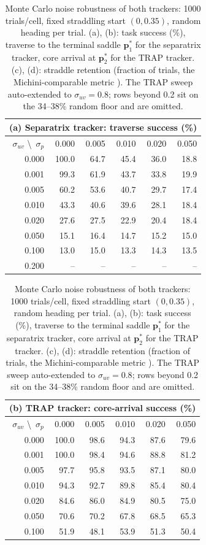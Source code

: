 \documentclass[lettersize,journal]{IEEEtran}
\begin{document}
\begin{table}[!t]
\centering
\caption{Monte Carlo noise robustness of both trackers: 1000
trials/cell, fixed straddling start $(0, 0.35)$, random heading per
trial. (a), (b): task success (\%), traverse to the terminal saddle
$\mathbf{p}^*_1$ for the separatrix tracker, core arrival at
$\mathbf{p}^*_2$ for the TRAP tracker. (c), (d): straddle retention
(fraction of trials, the Michini-comparable metric \cite{9}). The TRAP
sweep auto-extended to $\sigma_{uv} = 0.8$; rows beyond 0.2 sit on the
34--38\% random floor and are omitted.}
\label{tab:mc_success}
\footnotesize
\setlength{\tabcolsep}{4pt}
\begin{tabular}{r|rrrrr}
\multicolumn{6}{l}{(a) Separatrix tracker: traverse success (\%)} \\
\hline
$\sigma_{uv}$ \textbackslash\ $\sigma_p$ & 0.000 & 0.005 & 0.010 & 0.020 & 0.050 \\
\hline
0.000 & 100.0 & 64.7 & 45.4 & 36.0 & 18.8 \\
0.001 &  99.3 & 61.9 & 43.7 & 33.8 & 19.9 \\
0.005 &  60.2 & 53.6 & 40.7 & 29.7 & 17.4 \\
0.010 &  43.3 & 40.6 & 39.6 & 28.1 & 18.4 \\
0.020 &  27.6 & 27.5 & 22.9 & 20.4 & 18.4 \\
0.050 &  15.1 & 16.4 & 14.7 & 15.2 & 15.0 \\
0.100 &  13.0 & 15.0 & 13.3 & 14.3 & 13.5 \\
0.200 &  --   & --   & --   & --   & --   \\
\hline
\end{tabular}
\hspace{1.5em}
\begin{tabular}{r|rrrrr}
\multicolumn{6}{l}{(b) TRAP tracker: core-arrival success (\%)} \\
\hline
$\sigma_{uv}$ \textbackslash\ $\sigma_p$ & 0.000 & 0.005 & 0.010 & 0.020 & 0.050 \\
\hline
0.000 & 100.0 & 98.6 & 94.3 & 87.6 & 79.6 \\
0.001 & 100.0 & 98.4 & 94.6 & 88.8 & 81.2 \\
0.005 &  97.7 & 95.8 & 93.5 & 87.1 & 80.0 \\
0.010 &  94.3 & 92.7 & 89.8 & 85.4 & 80.4 \\
0.020 &  84.6 & 86.0 & 84.9 & 80.5 & 75.0 \\
0.050 &  70.6 & 70.2 & 67.8 & 68.5 & 65.3 \\
0.100 &  51.9 & 48.1 & 53.9 & 51.3 & 50.4 \\

\end{tabular}
\end{table}
\end{document}
